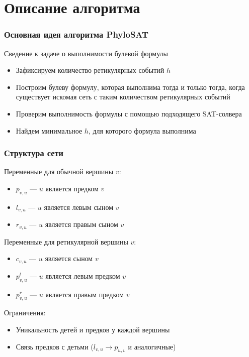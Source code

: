 \documentclass[hyperref={unicode}]{beamer}
\begin{document}
\section{Описание алгоритма}

\begin{frame}
\frametitle{Основная идея алгоритма PhyloSAT}

Сведение к задаче о выполнимости булевой формулы

\begin{itemize}
	\item Зафиксируем количество ретикулярных событий $h$
	\item Построим булеву формулу, которая выполнима тогда и только тогда, когда существует искомая сеть с таким количеством ретикулярных событий
	\item Проверим выполнимость формулы с помощью подходящего SAT-солвера
	\item Найдем минимальное $h$, для которого формула выполнима
\end{itemize}

\end{frame}

\begin{frame}
\frametitle{Структура сети}

Переменные для обычной вершины $v$:

\begin{itemize}
	\item $p_{v, u}$ --- $u$ является предком $v$
	\item $l_{v, u}$ --- $u$ является левым сыном $v$
	\item $r_{v, u}$ --- $u$ является правым сыном $v$
\end{itemize}

Переменные для ретикулярной вершины $v$:

\begin{itemize}
	\item $c_{v, u}$ --- $u$ является сыном $v$
	\item $p^l_{v, u}$ --- $u$ является левым предком $v$
	\item $p^r_{v, u}$ --- $u$ является правым предком $v$
\end{itemize}

Ограничения:
\begin{itemize}
	\item Уникальность детей и предков у каждой вершины
	\item Связь предков с детьми ($l_{v, u} \rightarrow p_{u, v}$ и аналогичные)
\end{itemize}

\end{frame}
\end{document}
